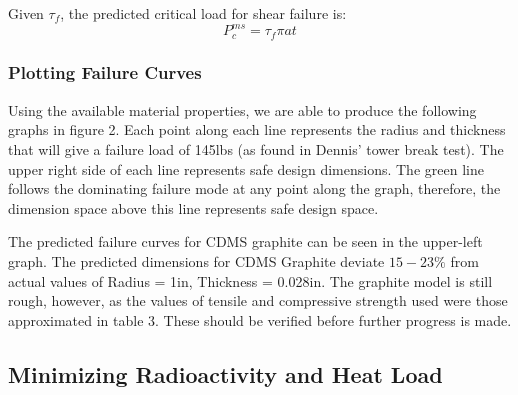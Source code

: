 \documentclass{report}
\begin{document}
Given $\tau_{f}$, the predicted critical load for shear failure is:
$$
P_{c}^{ms} = \tau_{f}\pi at
$$

\subsubsection{Plotting Failure Curves}

Using the available material properties, we are able to produce the following graphs in figure 2. Each point along each line represents the radius and thickness that will give a failure load of 145lbs (as found in Dennis' tower break test). The upper right side of each line represents safe design dimensions. The green line follows the dominating failure mode at any point along the graph, therefore, the dimension space above this line represents safe design space.


The predicted failure curves for CDMS graphite can be seen in the upper-left graph. The predicted dimensions for CDMS Graphite deviate $15-23\%$ from actual values of Radius = 1in, Thickness = 0.028in. The graphite model is still rough, however, as the values of tensile and compressive strength used were those approximated in table 3. These should be verified before further progress is made.

\subsection{Minimizing Radioactivity and Heat Load}
\end{document}
